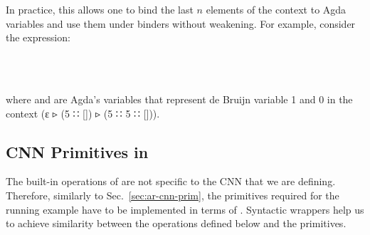 In practice, this allows one to bind the last $n$ elements of the
context to Agda variables and use them under binders without weakening.
For example, consider the expression:
\begin{code}%
%
\>[2]\AgdaFunction{\AgdaUnderscore{}}\AgdaSpace{}%
\AgdaSymbol{:}\AgdaSpace{}%
\AgdaSpace{}%
\AgdaSymbol{\AgdaUnderscore{}}\AgdaSpace{}%
\AgdaSymbol{\AgdaUnderscore{}}\<%
\\
%
\>[2]\AgdaSymbol{\AgdaUnderscore{}}\AgdaSpace{}%
\AgdaSymbol{=}%
\>[2003I]\AgdaSpace{}%
\AgdaSymbol{(}\AgdaSpace{}%
\AgdaSymbol{(}\AgdaSpace{}%
\AgdaSymbol{)}\AgdaSpace{}%
\AgdaSpace{}%
\AgdaSpace{}%
\AgdaSymbol{(}\AgdaSpace{}%
\AgdaSpace{}%
\AgdaSpace{}%
\AgdaSpace{}%
\AgdaInductiveConstructor{[]}\AgdaSymbol{)}\AgdaSpace{}%
\AgdaSpace{}%
\AgdaInductiveConstructor{[]}\AgdaSymbol{)}\AgdaSpace{}%
\AgdaSymbol{(}\AgdaSpace{}%
\AgdaInductiveConstructor{[]}\AgdaSymbol{)}\AgdaSpace{}%
\<%
\\
\>[.][@{}l@{}]\<[2003I]%
\>[6]\AgdaSpace{}%
\AgdaSpace{}%
\AgdaSpace{}%
\AgdaSpace{}%
\AgdaSpace{}%
\AgdaSpace{}%
\AgdaSpace{}%
\AgdaSpace{}%
\AgdaSpace{}%
\AgdaSpace{}%
\AgdaSpace{}%
\AgdaSpace{}%
\AgdaSpace{}%
\AgdaSymbol{(}\AgdaSpace{}%
\AgdaSpace{}%
\AgdaSymbol{)}\AgdaSpace{}%
\<%
\end{code}
where  and  are Agda's variables that represent
de Bruijn variable 1 and 0{} in the context (ε ▹  (5 ∷ []) ▹ 
 (5 ∷ 5 ∷ [])).



\subsection{CNN Primitives in }
The built-in operations of  are not specific to the CNN that we
are defining.  Therefore, similarly to Sec.~\ref{sec:ar-cnn-prim},
the primitives required for the running example have to be
implemented in terms of .  Syntactic wrappers help us
to achieve similarity between the operations defined below and the
 primitives.

